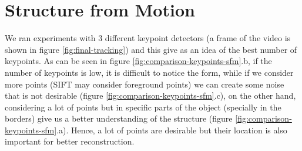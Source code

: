 \section{Structure from Motion}

We ran experiments with 3 different keypoint detectors (a frame of the video is shown in figure \ref{fig:final-tracking}) and this give as an idea of the best number of keypoints. As can be seen in figure \ref{fig:comparison-keypoints-sfm}.b, if the number of keypoints is low, it is difficult to notice the form, while if we consider more points (SIFT may consider foreground points) we can create some noise that is not desirable (figure \ref{fig:comparison-keypoints-sfm}.c), on the other hand, considering a lot of points but in specific parts of the object (specially in the borders) give us a better understanding of the structure (figure \ref{fig:comparison-keypoints-sfm}.a). Hence, a lot of points are desirable but their location is also important for better reconstruction.

